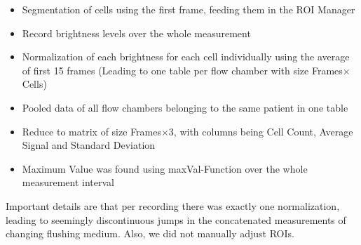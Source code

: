 \begin{itemize}
	\item Segmentation of cells using the first frame, feeding them in the ROI Manager
	\item Record brightness levels over the whole measurement
	\item Normalization of each brightness for each cell individually using the average of first 15 frames (Leading to one table per flow chamber with size Frames$\times$Cells)
	\item Pooled data of all flow chambers belonging to the same patient in one table
	\item Reduce to matrix of size Frames$\times$3, with columns being Cell Count, Average Signal and Standard Deviation
	\item Maximum Value was found using maxVal-Function over the whole measurement interval
\end{itemize}

Important details are that per recording there was exactly one normalization, leading to seemingly discontinuous jumps in the concatenated measurements of changing flushing medium. Also, we did not manually adjust ROIs. 



